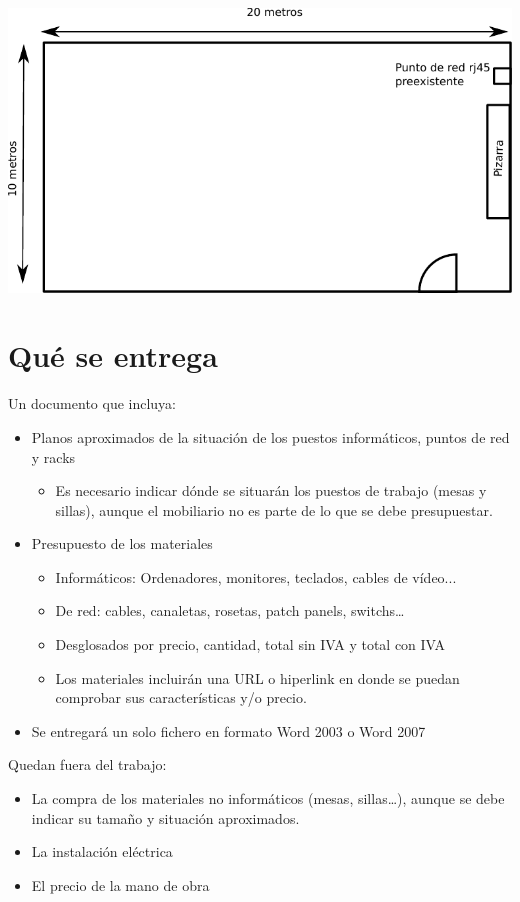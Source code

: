 \begin{center}
  \includegraphics{media/plano-aula.pdf}
\end{center}

\section{Qué se entrega}
Un documento que incluya:
\begin{itemize}
\item Planos aproximados de la situación de los puestos informáticos, puntos de red y racks
  \begin{itemize}
  \item Es necesario indicar dónde se situarán los puestos de trabajo (mesas y sillas), aunque el mobiliario no es
    parte de lo que se debe presupuestar.
\end{itemize}
\item Presupuesto de los materiales
  \begin{itemize}
  \item Informáticos: Ordenadores, monitores, teclados, cables de vídeo...
  \item De red: cables, canaletas, rosetas, patch panels, switchs…
  \item Desglosados por precio, cantidad, total sin IVA y total con IVA
  \item Los materiales incluirán una URL o hiperlink en donde se puedan comprobar sus características y/o precio.
\end{itemize}
\item Se entregará un solo fichero en formato Word 2003 o Word 2007
\end{itemize}

Quedan fuera del trabajo:
\begin{itemize}
\item La compra de los materiales no informáticos (mesas, sillas…), aunque se debe indicar su tamaño y situación aproximados.
\item La instalación eléctrica
\item El precio de la mano de obra
\end{itemize}

